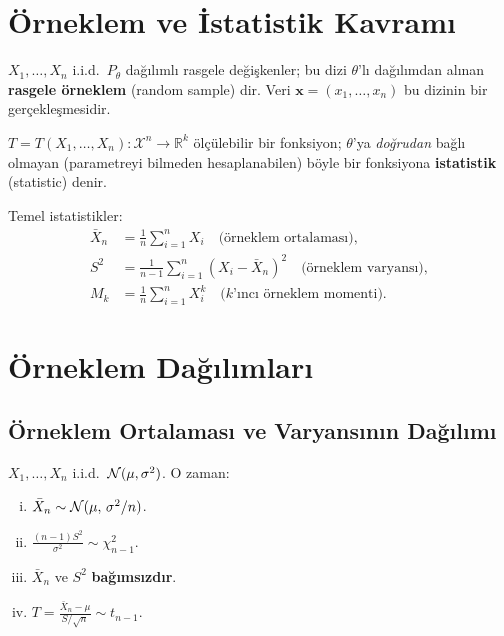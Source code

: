\section{Örneklem ve İstatistik Kavramı}
\label{sec:orneklem}

\begin{tanim}
\label{def:rasgele_orneklem}
$X_1, \ldots, X_n$ i.i.d.\ $P_\theta$ dağılımlı rasgele değişkenler;
bu dizi $\theta$'lı dağılımdan alınan \textbf{rasgele örneklem} (random sample) dir.
Veri $\mathbf{x} = (x_1,\ldots,x_n)$ bu dizinin bir gerçekleşmesidir.
\end{tanim}

\begin{tanim}[İstatistik]
\label{def:istatistik}
$T = T(X_1,\ldots,X_n) : \mathcal{X}^n \to \mathbb{R}^k$ ölçülebilir bir fonksiyon;
$\theta$'ya \emph{doğrudan} bağlı olmayan (parametreyi bilmeden hesaplanabilen) böyle
bir fonksiyona \textbf{istatistik} (statistic) denir.

Temel istatistikler:
\begin{align*}
  \bar{X}_n &= \frac{1}{n}\sum_{i=1}^n X_i \quad \text{(örneklem ortalaması)}, \\
  S^2 &= \frac{1}{n-1}\sum_{i=1}^n (X_i - \bar{X}_n)^2 \quad \text{(örneklem varyansı)}, \\
  M_k &= \frac{1}{n}\sum_{i=1}^n X_i^k \quad \text{($k$'ıncı örneklem momenti)}.
\end{align*}
\end{tanim}

\section{Örneklem Dağılımları}
\label{sec:orneklem_dagilim}

\subsection{Örneklem Ortalaması ve Varyansının Dağılımı}

\begin{teorem}
\label{thm:normal_orneklem}
$X_1,\ldots,X_n$ i.i.d.\ $\mathcal{N}(\mu,\sigma^2)$. O zaman:
\begin{enumerate}[(i)]
  \item $\bar{X}_n \sim \mathcal{N}(\mu,\, \sigma^2/n)$.
  \item $\frac{(n-1)S^2}{\sigma^2} \sim \chi^2_{n-1}$.
  \item $\bar{X}_n$ ve $S^2$ \textbf{bağımsızdır}.
  \item $T = \frac{\bar{X}_n - \mu}{S/\sqrt{n}} \sim t_{n-1}$.
\end{enumerate}
\end{teorem}

